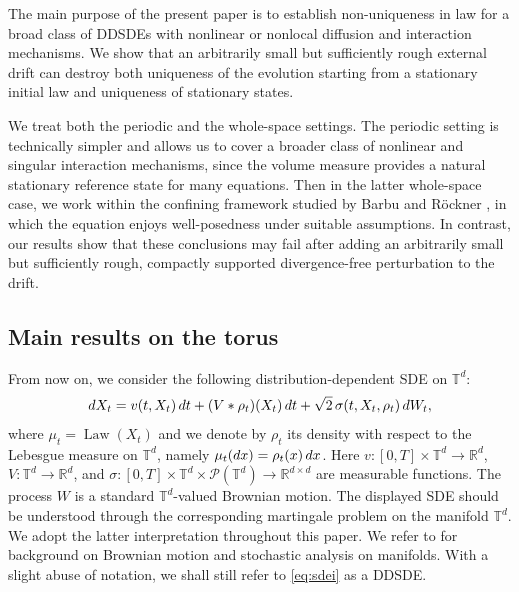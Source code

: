 \documentclass[10pt,a4paper]{amsart}
\numberwithin{equation}{section}
\def\dif{{\mathord{{\rm d}}}}
\def\dif{{\mathord{{\rm d}}}}
\begin{document}
 
The main purpose of the present paper is to establish non-uniqueness in law
for a broad class of DDSDEs with nonlinear or nonlocal diffusion and
interaction mechanisms. We show that an arbitrarily small but sufficiently
rough external drift can destroy both uniqueness of the evolution starting
from a stationary initial law and uniqueness of stationary states.
 

We treat both the periodic and the whole-space settings. The periodic setting
is technically simpler and allows us to cover a broader class of nonlinear and
singular interaction mechanisms, since the   volume measure provides
a natural stationary reference state for many equations. Then in the latter whole-space case, we work within the confining framework studied by
Barbu and R\"ockner \cite{BR23}, in which the   equation enjoys
well-posedness under suitable assumptions. In   contrast, our results show
that these conclusions may fail after adding an arbitrarily small but
sufficiently rough, compactly supported divergence-free perturbation to the
drift.
 


\subsection{Main results on the torus}

From now on, we consider the following distribution-dependent SDE on
$\mathbb{T}^d$:
\begin{align}
    \dif X_t
    =
    v(t,X_t)\,\dif t
    +(V*\rho_t)(X_t)\,\dif t
    +\sqrt{2}\,\sigma(t,X_t,\rho_t)\,\dif W_t ,
    \label{eq:sdei}
\end{align}
where $\mu_t=\operatorname{Law}(X_t)$ and   we denote by $\rho_t$
its density with respect to the Lebesgue measure on $\mathbb{T}^d$, namely $\mu_t(\dif x)=\rho_t(x)\,\dif x$.  Here
$v:[0,T]\times\mathbb{T}^d\to\mathbb{R}^d$,
$V:\mathbb{T}^d\to\mathbb{R}^d$, and
$\sigma:[0,T]\times\mathbb{T}^d\times\mathcal P(\mathbb{T}^d)
\to \mathbb{R}^{d\times d}$ are measurable functions.  
The process $W$ is a standard $\mathbb{T}^d$-valued Brownian motion.
The displayed SDE should be understood  
through the corresponding martingale problem on the manifold $\mathbb{T}^d$.
We adopt the latter interpretation throughout this paper. We refer to
\cite{Hsu02} for background on Brownian motion and stochastic analysis on
manifolds. With a slight abuse of notation, we shall still refer to
\eqref{eq:sdei} as a DDSDE.
\end{document}
